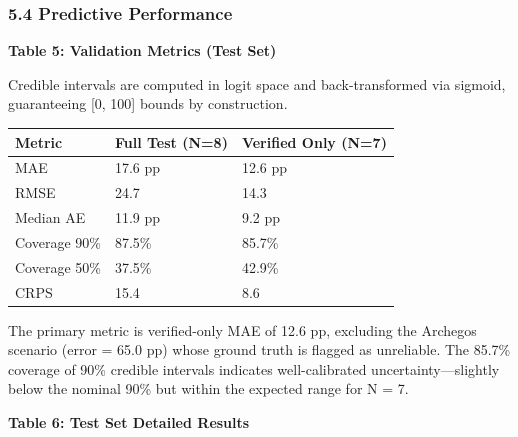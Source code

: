 \documentclass[
]{article}
\begin{document}
\subsubsection{5.4 Predictive Performance}\label{predictive-performance}

\textbf{Table 5: Validation Metrics (Test Set)}

Credible intervals are computed in logit space and back-transformed via
sigmoid, guaranteeing {[}0, 100{]} bounds by construction.

\begin{longtable}[]{@{}lll@{}}
\toprule\noalign{}
Metric & Full Test (N=8) & Verified Only (N=7) \\
\midrule\noalign{}
\endhead
\bottomrule\noalign{}
\endlastfoot
MAE & 17.6 pp & 12.6 pp \\
RMSE & 24.7 & 14.3 \\
Median AE & 11.9 pp & 9.2 pp \\
Coverage 90\% & 87.5\% & 85.7\% \\
Coverage 50\% & 37.5\% & 42.9\% \\
CRPS & 15.4 & 8.6 \\
\end{longtable}

The primary metric is verified-only MAE of 12.6 pp, excluding the
Archegos scenario (error = 65.0 pp) whose ground truth is flagged as
unreliable. The 85.7\% coverage of 90\% credible intervals indicates
well-calibrated uncertainty---slightly below the nominal 90\% but within
the expected range for N = 7.

\textbf{Table 6: Test Set Detailed Results}
\end{document}

